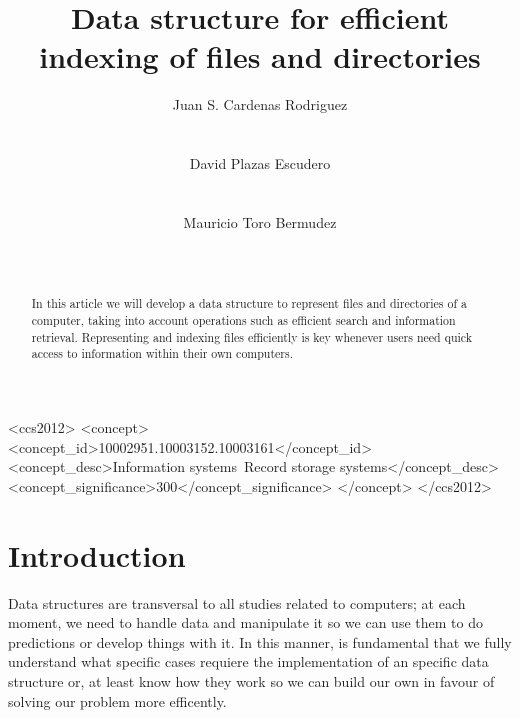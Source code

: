 \documentclass{sig-alternate-05-2015}
\begin{document}
  \doi{}
  \isbn{}

  \title{Data structure for efficient indexing of files and directories}


  \author{
    \alignauthor
    Juan S. Cardenas Rodriguez\\
           \\
           \\
    \alignauthor
    David Plazas Escudero\\
           \\
           \\
    \alignauthor
    Mauricio Toro Bermudez\\
           \\
           \\
  }

\begin{CCSXML}
<ccs2012>
<concept>
<concept_id>10002951.10003152.10003161</concept_id>
<concept_desc>Information systems~Record storage systems</concept_desc>
<concept_significance>300</concept_significance>
</concept>
</ccs2012>
\end{CCSXML}

  \maketitle

  \begin{abstract}
    In this article we will develop a data structure to represent files and directories of a computer,
    taking into account operations such as efficient search and information retrieval. Representing and
    indexing files efficiently is key whenever users need quick access to information within
    their own computers.
  \end{abstract}

  \printccsdesc

  \section{Introduction}
    Data structures are transversal to all studies related to computers; at each moment, we need to handle
    data and manipulate it so we can use them to do predictions or develop things with it. In this manner, is fundamental
    that we fully understand what specific cases requiere the implementation of an specific data structure or,
    at least know how they work so we can build our own in favour of solving our problem more efficently.
\end{document}
